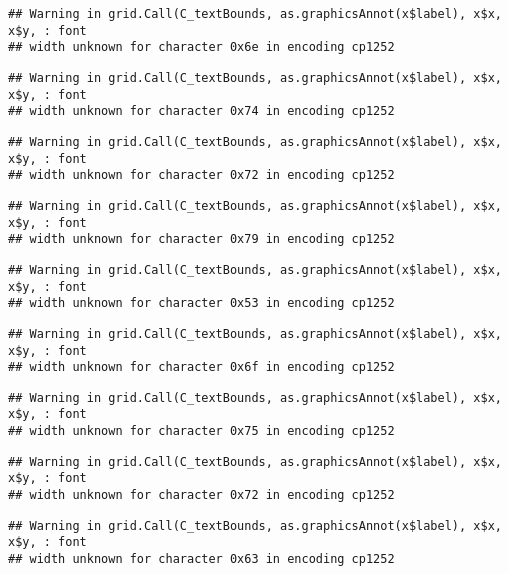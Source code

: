 \documentclass[
]{article}
\begin{document}
\begin{verbatim}
## Warning in grid.Call(C_textBounds, as.graphicsAnnot(x$label), x$x, x$y, : font
## width unknown for character 0x6e in encoding cp1252
\end{verbatim}

\begin{verbatim}
## Warning in grid.Call(C_textBounds, as.graphicsAnnot(x$label), x$x, x$y, : font
## width unknown for character 0x74 in encoding cp1252
\end{verbatim}

\begin{verbatim}
## Warning in grid.Call(C_textBounds, as.graphicsAnnot(x$label), x$x, x$y, : font
## width unknown for character 0x72 in encoding cp1252
\end{verbatim}

\begin{verbatim}
## Warning in grid.Call(C_textBounds, as.graphicsAnnot(x$label), x$x, x$y, : font
## width unknown for character 0x79 in encoding cp1252
\end{verbatim}

\begin{verbatim}
## Warning in grid.Call(C_textBounds, as.graphicsAnnot(x$label), x$x, x$y, : font
## width unknown for character 0x53 in encoding cp1252
\end{verbatim}

\begin{verbatim}
## Warning in grid.Call(C_textBounds, as.graphicsAnnot(x$label), x$x, x$y, : font
## width unknown for character 0x6f in encoding cp1252
\end{verbatim}

\begin{verbatim}
## Warning in grid.Call(C_textBounds, as.graphicsAnnot(x$label), x$x, x$y, : font
## width unknown for character 0x75 in encoding cp1252
\end{verbatim}

\begin{verbatim}
## Warning in grid.Call(C_textBounds, as.graphicsAnnot(x$label), x$x, x$y, : font
## width unknown for character 0x72 in encoding cp1252
\end{verbatim}

\begin{verbatim}
## Warning in grid.Call(C_textBounds, as.graphicsAnnot(x$label), x$x, x$y, : font
## width unknown for character 0x63 in encoding cp1252
\end{verbatim}
\end{document}
